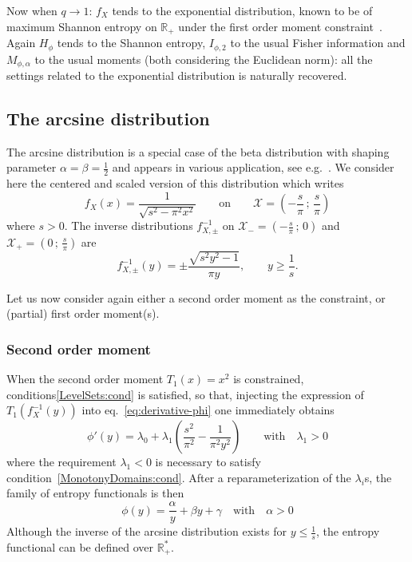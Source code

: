 \documentclass[entropy,article,submit,moreauthors,pdftex]{Definitions/mdpi}
\def\Rset{\mathbb{R}}%
\def\X{\mathcal{X}}%
\begin{document}
Now when $q \to 1$: $f_X$ tends  to the exponential distribution, known to be of
maximum   Shannon  entropy   on   $\Rset_+$  under   the   first  order   moment
constraint~\cite{CovTho06}.   Again  $H_\phi$  tends  to  the  Shannon  entropy,
$I_{\phi,2}$ to the usual Fisher  information and $M_{\phi,\alpha}$ to the usual
moments (both considering  the Euclidean norm): all the settings  related to the
exponential distribution is naturally recovered.




\subsection{The arcsine distribution}
\label{subsecapp:Arcsine}

The arcsine distribution is a special case of the beta distribution with shaping
parameter $\alpha  = \beta =  \frac12$ and  appears in various  application, see
e.g.~\cite{JohKot95:v2}. We  consider here  the centered  and scaled  version of
this distribution which writes
%
\[
f_X(x) = \frac{1}{\sqrt{ s^2 - \pi^2 x^2}} \qquad \mbox{on} \qquad \X = \left( -
\frac{s}{\pi} \, ; \, \frac{s}{\pi} \right)
\]
%
where $s >  0$.  The inverse distributions $f_{X,\pm}^{-1}$ on  $\X_- = \left( -
\frac{s}{\pi} \,  ; \, 0  \right)$ and  $\X_+ = \left(  0 \, ;  \, \frac{s}{\pi}
\right)$ are
%
\[
f_{X,\pm}^{-1}(y)  =  \pm  \frac{\sqrt{s^2  y^2  -  1}}{\pi  y},  \qquad  y  \ge
\frac{1}{s}.
\]


Let us  now consider again  either a second order  moment as the  constraint, or
(partial) first order moment(s).



\subsubsection{Second order moment}
\label{subsubsecapp:ArcsineSecondOrder}

When   the    second   order   moment    $T_1(x)   =   x^2$    is   constrained,
conditions\ref{LevelSets:cond} is  satisfied, so that, injecting  the expression
of  $T_1\left(  f_X^{-1}(y)   \right)$  into  eq.~\eqref{eq:derivative-phi}  one
immediately obtains
%
\[
\phi'(y)=\lambda_0  +   \lambda_1  \left(  \frac{s^2}{\pi^2}   -  \frac{1}{\pi^2
  y^2}\right) \qquad \mbox{with} \quad \lambda_1 > 0
\]
%
where    the   requirement    $\lambda_1   <0$    is   necessary    to   satisfy
condition~\ref{MonotonyDomains:cond}.    After  a   reparameterization  of   the
$\lambda_i$s, the family of entropy functionals is then
%
\[
\phi(y) = \frac{\alpha}{y} + \beta y + \gamma \quad \mbox{with} \quad \alpha > 0
\]
%
Although the inverse of the arcsine distribution exists for $y \le \frac{1}{s}$,
the entropy functional can be defined over $\Rset_+^*$.
\end{document}
